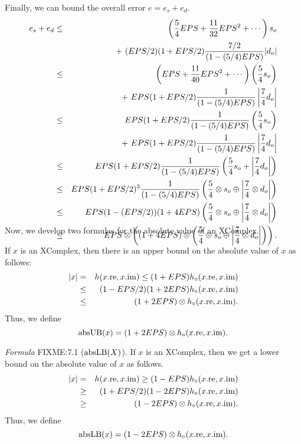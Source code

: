 Finally, we can bound the overall error $e = e_s + e_d$.
\begin{eqnarray*}
e_s + e_d&\le& \left({5 \over 4} EPS + {11 \over 32} EPS^2 +\cdots\right) s_o\\
&& +\
 (EPS/2) (1+EPS/2)
 {7/2 \over (1 - (5/4)EPS)}|d_o|\\
&\le& \left( EPS + {11 \over 40} EPS^2 +\cdots\right) \left({5 \over 4} s_o\right) \\
&&+\
 EPS (1+EPS/2)
 {1 \over (1 - (5/4)EPS)}\left|{7 \over 4} d_o\right|\\
&\le& EPS (1+EPS/2)
 {1 \over (1 - (5/4)EPS)} \left({5 \over 4} s_o\right) \\
&&+
\  EPS (1+EPS/2)
 {1 \over (1 - (5/4)EPS)}\left|{7 \over 4} d_o\right|\\
&\le& EPS (1+EPS/2)
 {1 \over (1 - (5/4)EPS)}
\left({5 \over 4} s_o +\left|{7 \over 4} d_o\right|\right)\\
&\le& EPS (1+EPS/2)^3
 {1 \over (1 - (5/4)EPS)}
\left({5 \over 4} \otimes s_o \oplus \left|{7 \over 4} \otimes d_o\right|\right)\\
&\le& EPS (1 - (EPS/2))(1 + 4 EPS) 
\left({5 \over 4} \otimes s_o \oplus \left|{7 \over 4} \otimes d_o\right|\right)\\
&\le& EPS \otimes \left((1 + 4 EPS) \otimes
\left({5 \over 4} \otimes s_o \oplus \left|{7 \over 4} \otimes d_o\right|\right)\right).\\
\noalign{\vskip-36pt}
\end{eqnarray*}
\enddemo
 
Now, we develop two formulas for the absolute value of an XComplex.
 

If $x$ is an XComplex, then
there is an upper bound on the absolute value of $x$ as follows:
\begin{eqnarray*}
|x| &=& h(x.{\rm re},x.{\rm im}) \le (1 + EPS) h_{\circ} (x.{\rm re},x.{\rm im})\\
&\le& (1 - EPS/2) (1 + 2EPS)h_{\circ} (x.{\rm re},x.{\rm im}) \\
&\le& (1 + 2EPS) \otimes h_{\circ} (x.{\rm re},x.{\rm im}).
\end{eqnarray*}
Thus, we define 
$${\rm absUB}(x) = (1 + 2EPS) \otimes h_{\circ} (x.{\rm re},x.{\rm im}).$$ 
\enddemo

{\it Formula} FIXME:7.1 (${\rm absLB}(X)$).
If $x$ is an XComplex, then
we get a lower bound on the absolute value of $x$ as follows.
\begin{eqnarray*}
|x|& =& h(x.{\rm re},x.{\rm im}) \ge (1 - EPS) h_{\circ} (x.{\rm re},x.{\rm im})\\
&\ge& (1 + EPS/2) (1 - 2EPS) h_{\circ} (x.{\rm
re},x.{\rm im})\\
&\ge& (1 - 2EPS) \otimes h_{\circ} (x.{\rm re},x.{\rm im}).
\end{eqnarray*}
Thus, we define 
$${\rm absLB}(x) = (1 - 2EPS) \otimes h_{\circ} (x.{\rm re},x.{\rm im}).$$ 
\vglue12pt

